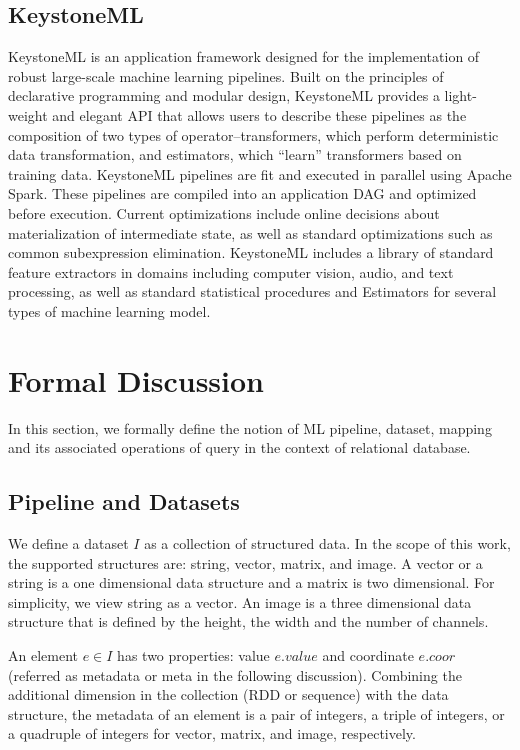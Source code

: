 \documentclass{sig-alternate}
\begin{document}
\subsection{KeystoneML}
KeystoneML is an application framework designed for the implementation of robust large-scale machine learning pipelines. Built on the principles of declarative programming and modular design, KeystoneML provides a light-weight and elegant API that allows users to describe these pipelines as the composition of two types of operator--transformers, which perform deterministic data transformation, and estimators, which ``learn'' transformers based on training data. KeystoneML pipelines are fit and executed in parallel using Apache Spark. These pipelines are compiled into an application DAG and optimized before execution. Current optimizations include online decisions about materialization of intermediate state, as well as standard optimizations such as common subexpression elimination. KeystoneML includes a library of standard feature extractors in domains including computer vision, audio, and text processing, as well as standard statistical procedures and Estimators for several types of machine learning model.

\section{Formal Discussion}
\label{sec:Mapping}
In this section, we formally define the notion of ML pipeline, dataset, mapping and its associated operations of query in the context of 
relational database.

\subsection{Pipeline and Datasets}
\label{sec:Map-Pipe-Data}
We define a dataset $I$ as a collection of structured data. In the scope of this work, the supported structures are: 
string, vector, matrix, and image. A vector or a string is a one dimensional data structure and a matrix is two dimensional. 
For simplicity, we view string as a vector.
An image is a three dimensional data structure that is defined by the height, the width and the number
of channels. 

An element $e \in I$ has two properties: value $e.value$ and coordinate $e.coor$ (referred as metadata or meta
in the following discussion). 
Combining the additional dimension in the collection (RDD or sequence) with the data structure, 
the metadata of an element is a pair of integers, a triple of integers, or a quadruple of integers
for vector, matrix, and image, respectively.
\end{document}
